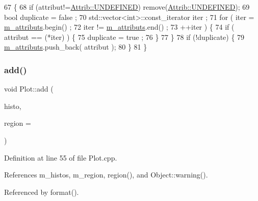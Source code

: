 \begin{DoxyCode}
67                             \{
68     \textcolor{keywordflow}{if} (attribut!=\hyperlink{classAttrib_a69e171d7cc6417835a5a306d3c764235a3a8da2ab97dda18aebab196fe4100531}{Attrib::UNDEFINED}) \textcolor{keyword}{remove}(\hyperlink{classAttrib_a69e171d7cc6417835a5a306d3c764235a3a8da2ab97dda18aebab196fe4100531}{Attrib::UNDEFINED});
69     \textcolor{keywordtype}{bool} duplicate = false ;
70     std::vector<int>::const\_iterator iter ;
71     \textcolor{keywordflow}{for} ( iter  = \hyperlink{classAttrib_ac4bd58a0cc6b38a3b711d609a3d3aacc}{m\_attributs}.begin() ;
72           iter != \hyperlink{classAttrib_ac4bd58a0cc6b38a3b711d609a3d3aacc}{m\_attributs}.end()   ;
73           ++iter ) \{
74       \textcolor{keywordflow}{if} ( attribut == (*iter) ) \{
75         duplicate = true ;
76       \}
77     \}
78     \textcolor{keywordflow}{if} (!duplicate) \{
79       \hyperlink{classAttrib_ac4bd58a0cc6b38a3b711d609a3d3aacc}{m\_attributs}.push\_back( attribut );
80     \}
81   \}
\end{DoxyCode}
\mbox{\label{classPlot_ac0e03af81b0591d4786ff03441524eb2}} 
\subsubsection{\texorpdfstring{add()}{add()}\hspace{0.1cm}{\footnotesize\ttfamily [2/2]}}
{\footnotesize\ttfamily void Plot\+::add (\begin{DoxyParamCaption}\item[{T\+H1D $\ast$}]{histo,  }\item[{unsigned int}]{region = {} }\end{DoxyParamCaption})}



Definition at line 55 of file Plot.\+cpp.



References m\+\_\+histos, m\+\_\+region, region(), and Object\+::warning().



Referenced by format().


